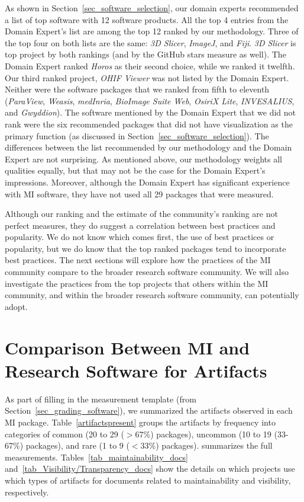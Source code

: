 \documentclass[11pt]{article}
\begin{document}
As shown in Section~\ref{sec_software_selection}, our domain experts recommended
a list of top software with 12 software products.  All the top 4 entries from
the Domain Expert's list are among the top 12 ranked by our methodology. Three
of the top four on both lists are the same: \textit{3D Slicer}, \textit{ImageJ},
and \textit{Fiji}. \textit{3D Slicer} is top project by both rankings (and by
the GitHub stars measure as well).  The Domain Expert ranked \textit{Horos} as
their second choice, while we ranked it twelfth.  Our third ranked project,
\textit{OHIF Viewer} was not listed by the Domain Expert.  Neither were the
software packages that we ranked from fifth to eleventh (\textit{ParaView},
\textit{Weasis}, \textit{medInria}, \textit{BioImage Suite Web}, \textit{OsiriX
Lite}, \textit{INVESALIUS}, and \textit{Gwyddion}).  The software mentioned by
the Domain Expert that we did not rank were the six recommended packages that
did not have visualization as the primary function (as discussed in
Section~\ref{sec_software_selection}).  The differences between the list
recommended by our methodology and the Domain Expert are not surprising.  As
mentioned above, our methodology weights all qualities equally, but that may not
be the case for the Domain Expert's impressions.  Moreover, although the Domain
Expert has significant experience with MI software, they have not used all 29
packages that were measured.

Although our ranking and the estimate of the community's ranking are not perfect
measures, they do suggest a correlation between best practices and popularity.
We do not know which comes first, the use of best practices or popularity, but
we do know that the top ranked packages tend to incorporate best practices. The
next sections will explore how the practices of the MI community compare to the
broader research software community. We will also investigate the practices from
the top projects that others within the MI community, and within the broader
research software community, can potentially adopt.

\section{Comparison Between MI and Research Software for Artifacts}
\label{Sec_CompareArtifacts}

As part of filling in the measurement template (from
Section~\ref{sec_grading_software}), we summarized the artifacts observed in
each MI package. Table~\ref{artifactspresent} groups the artifacts by frequency
into categories of common (20 to 29 ($>$67\%) packages), uncommon (10 to 19
(33-67\%) packages), and rare (1 to 9 ($<$33\%) packages). \citet{Dong2021-Data}
summarizes the full measurements.  Tables~\ref{tab_maintainability_docs}
and~\ref{tab_Visibility/Transparency_docs} show the details on which projects
use which types of artifacts for documents related to maintainability and
visibility, respectively.
\end{document}
